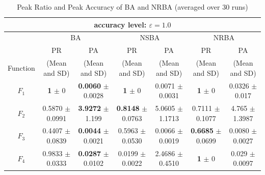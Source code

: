 \documentclass[conference]{IEEEtran}
\begin{document}
\begin{table}[h]
\caption{Peak Ratio and Peak Accuracy of BA and NRBA (averaged over 30 runs)}
\begin{center}
\begin{tabular}{c|c|c|c|c|c|c}
\multicolumn{7}{c}{ accuracy level: $\varepsilon = 1.0$} \\
\hline
\multicolumn{1}{c|}{} & \multicolumn{2}{c|}{BA} & \multicolumn{2}{c|}{NSBA} & \multicolumn{2}{c}{NRBA} \\
\hline
 & PR & PA & PR & PA & PR & PA \\

Function & (Mean and SD) & (Mean and SD) & (Mean and SD) & (Mean and SD) & (Mean and SD) & (Mean and SD)  \\
\hline
$F_1 $ & {\bf 1} $\pm$ 0 & {\bf 0.0060} $\pm$ 0.0028 & {\bf 1} $\pm$ 0 & 0.0071 $\pm$ 0.0031 & {\bf 1} $\pm$ 0  & 0.0326 $\pm$ 0.017  \\
\hline
$F_2 $ & 0.5870 $\pm$ 0.0991 & {\bf 3.9272} $\pm$ 1.199 & {\bf 0.8148} $\pm$ 0.0763 & 5.0605 $\pm$ 1.1713 &  0.7111 $\pm$ 0.1077 & 4.765 $\pm$ 1.3987 \\
\hline
$F_3 $ & 0.4407 $\pm$ 0.0839 & {\bf 0.0044} $\pm$ 0.0021 & 0.5963 $\pm$ 0.0530 & 0.0066 $\pm$ 0.0019 & {\bf 0.6685} $\pm$ 0.0699 & 0.0080 $\pm$ 0.0027 \\
\hline
$F_4 $ & 0.9833 $\pm$ 0.0333  & {\bf 0.0287} $\pm$ 0.0102 & 0.0199 $\pm$ 0.0022 & 2.4686 $\pm$ 0.4510 & {\bf 1} $\pm$ 0 & 0.029 $\pm$ 0.0097 \\
\hline
\end{tabular}
\label{tab2}
\end{center}
\end{table}
\end{document}
